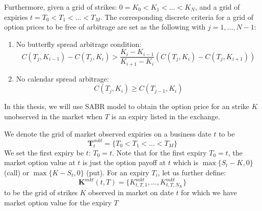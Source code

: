 \documentclass[letterpaper,12pt,titlepage,oneside,final]{book}
\numberwithin{equation}{section}
\theoremstyle{definition}
\begin{document}
\begin{enumerate}

\end{enumerate}

Furthermore,  given a  grid of strikes: $0=K_0<K_1<\dots<K_{N}$, and a grid of expiries $t=T_0 < T_1 < \dots< T_{M} $.   The corresponding discrete criteria \cite{carr2005note} for a grid of  option prices to be free of arbitrage are set as the following with $j=1,\dots,N-1$: 
\begin{enumerate}
	\item  No butterfly spread arbitrage condition:
	 \begin{equation}
	C(T_{j},K_{i-1})-C(T_{j},K_{i}) > \frac{K_i-K_{i-1}}{K_{i+1}-K_{i}}
	\left( C(T_{j},K_{i})-C(T_{j},K_{i+1})  \right)
	\label{eq:DiscreteCond1}
\end{equation}
	\item  No calendar spread arbitrage:
	\begin{equation}
	C(T_{j},K_{i})\geq C(T_{j-1},K_{i})
	\label{eq:DiscreteCond2}
\end{equation}

\end{enumerate}



In this thesis, we will use SABR model to obtain the option price for an strike $K$ unobserved in the market when $T$ is an expiry listed in the exchange.


We denote the grid of market observed expiries on a business date $t$ to be \[
\mathbf{T}^{mkt}_t=\{ T_{0}<
T_1 < \dots< T_{M}
\}
\]
We set the first expiry be $t$: $T_{0}=t$. Note that for the first expiry $T_{0}=t$, the market option value at $t$ is just the option payoff at $t$ which is $\max\{S_t-K,0\}$ (call) or  $\max\{K-S_t,0\}$ (put).  For an  expiry $T_i$, let us further define:
\[\mathbf{K}^{mkt}(t,T)=
\{
	K^{mkt}_{t,T,1},\dots,K^{mkt}_{t,T,N_K}
\}
\] to be the grid of strikes $K$ observed in market on date $t$  for which we have market option value for the expiry $T$
\end{document}
